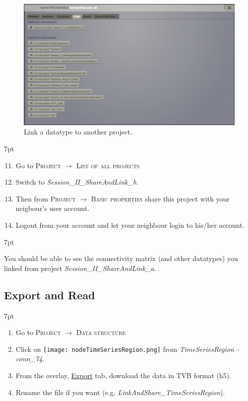 \documentclass{tufte-handout}
\newenvironment{formal}{%
  \def\FrameCommand{%
    \hspace{1pt}%
    {\color{DarkBlue}\vrule width 2pt}%
    {\color{formalshade}\vrule width 4pt}%
    \colorbox{formalshade}%
  }%
  \MakeFramed{\advance\hsize-\width\FrameRestore}%
  \noindent\hspace{-4.55pt}%
  \begin{adjustwidth}{}{7pt}%
  \vspace{2pt}\vspace{2pt}%
}
{%
  \vspace{2pt}\end{adjustwidth}\endMakeFramed%
}
\newenvironment{blah}{%
  \def\FrameCommand{%
    \hspace{1pt}%
    {\color{DarkOrange}\vrule width 2pt}%
    {\color{PeachPuff}\vrule width 4pt}%
    \colorbox{PeachPuff}%
  }%
  \MakeFramed{\advance\hsize-\width\FrameRestore}%
  \noindent\hspace{-4.55pt}%
  \begin{adjustwidth}{}{7pt}%
  \vspace{2pt}\vspace{2pt}%
}
{%
  \vspace{2pt}\end{adjustwidth}\endMakeFramed%
}
\begin{document}
\begin{figure}[h]
  \includegraphics[width=\linewidth]{Handout_UI_LinkAndShare_LinkedProject}%
  \caption{Link a datatype to another project.}%
  \label{fig:linkproject}%
\end{figure}

\begin{formal}
  \begin{enumerate}[resume]
    \setcounter{enumi}{10}
    \item Go to \textsc{Project} $\rightarrow$ \textsc{List of all projects}
    \item Switch to \textit{Session\_II\_ShareAndLink\_b}.
    \item Then from \textsc{Project} $\rightarrow$ \textsc{Basic properties} 
share this project with your neigbour's user account. 
    \item Logout from your account and let your neighbour login to his/her account. 
  \end{enumerate}
\end{formal} 

\begin{blah}
You should be able to see the connectivity matrix (and other datatypes) you linked
from project \textit{Session\_II\_ShareAndLink\_a}.
\end{blah}

\subsection{Export and Read}\label{sec:link_and_share}

\begin{formal}
  \begin{enumerate}
    \item Go to \textsc{Project} $\rightarrow$ \textsc{Data structure}
    \item Click on \texttt{[image: nodeTimeSeriesRegion.png]} from \textit{TimeSeriesRegion - conn\_74}. 
    \item From the overlay, \underline{Export} tab, download the data in TVB format (h5).
    \item Rename the file if you want (e.g. \textit{LinkAndShare\_TimeSeriesRegion}).
  \end{enumerate}
\end{formal} 
\end{document}
